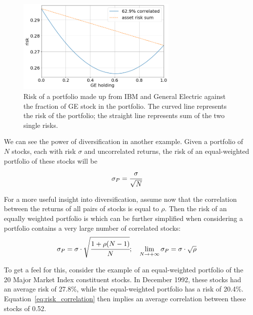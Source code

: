 \begin{figure}[htb]
	\centering
	\includegraphics[width=0.7\textwidth]{figures/diversification}
	\caption{Risk of a portfolio made up from IBM and General Electric against the fraction of GE stock in the portfolio. The curved line represents the risk of the portfolio; the straight line represents sum of the two single risks.}
	\label{fig:diversification}
\end{figure}

We can see the power of diversification in another example. Given a  portfolio of $N$ stocks, each with risk $\sigma$ and uncorrelated returns, the risk of an equal-weighted portfolio of these stocks will be
\begin{equation}
\sigma_P = \cfrac{\sigma}{\sqrt{N}}
\end{equation}

For a more useful insight into diversification, assume now that the correlation between the returns of all pairs of stocks is equal to $\rho$. Then the risk of an equally weighted portfolio is which can be further simplified when considering a portfolio contains a very large number of correlated stocks:
\begin{equation}
\sigma_P = \sigma\cdot\sqrt{\cfrac{1+\rho(N-1)}{N}};\quad \lim_{N \to +\infty} \sigma_P = \sigma\cdot\sqrt{\rho}
\label{eq:risk_correlation}
\end{equation}

To get a feel for this, consider the example of an equal-weighted portfolio of the 20 Major Market Index constituent stocks. In December 1992, these stocks had an average risk of 27.8\%, while the equal-weighted portfolio has a risk of 20.4\%. Equation~\ref{eq:risk_correlation} then implies an average correlation between these stocks of 0.52. 

%

